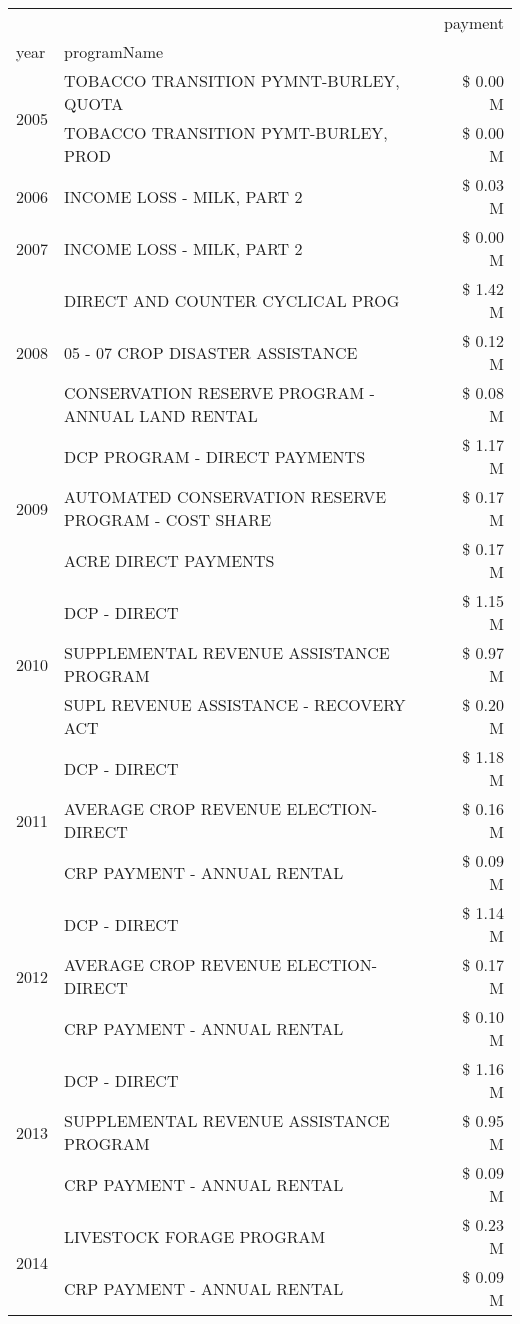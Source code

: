 \begin{tabular}{llr}
\toprule
 &  & payment \\
year & programName &  \\
\midrule
\multirow[t]{2}{*}{2005} & TOBACCO TRANSITION PYMNT-BURLEY, QUOTA & \$ 0.00 M \\
 & TOBACCO TRANSITION PYMT-BURLEY, PROD & \$ 0.00 M \\
\cline{1-3}
2006 & INCOME LOSS - MILK, PART 2 & \$ 0.03 M \\
\cline{1-3}
2007 & INCOME LOSS - MILK, PART 2 & \$ 0.00 M \\
\cline{1-3}
\multirow[t]{3}{*}{2008} & DIRECT AND COUNTER CYCLICAL PROG & \$ 1.42 M \\
 & 05 - 07 CROP DISASTER ASSISTANCE & \$ 0.12 M \\
 & CONSERVATION RESERVE PROGRAM - ANNUAL LAND RENTAL & \$ 0.08 M \\
\cline{1-3}
\multirow[t]{3}{*}{2009} & DCP PROGRAM - DIRECT PAYMENTS & \$ 1.17 M \\
 & AUTOMATED CONSERVATION RESERVE PROGRAM - COST SHARE & \$ 0.17 M \\
 & ACRE DIRECT PAYMENTS & \$ 0.17 M \\
\cline{1-3}
\multirow[t]{3}{*}{2010} & DCP - DIRECT & \$ 1.15 M \\
 & SUPPLEMENTAL REVENUE ASSISTANCE PROGRAM & \$ 0.97 M \\
 & SUPL REVENUE ASSISTANCE - RECOVERY ACT & \$ 0.20 M \\
\cline{1-3}
\multirow[t]{3}{*}{2011} & DCP - DIRECT & \$ 1.18 M \\
 & AVERAGE CROP REVENUE ELECTION-DIRECT & \$ 0.16 M \\
 & CRP PAYMENT - ANNUAL RENTAL & \$ 0.09 M \\
\cline{1-3}
\multirow[t]{3}{*}{2012} & DCP - DIRECT & \$ 1.14 M \\
 & AVERAGE CROP REVENUE ELECTION-DIRECT & \$ 0.17 M \\
 & CRP PAYMENT - ANNUAL RENTAL & \$ 0.10 M \\
\cline{1-3}
\multirow[t]{3}{*}{2013} & DCP - DIRECT & \$ 1.16 M \\
 & SUPPLEMENTAL REVENUE ASSISTANCE PROGRAM & \$ 0.95 M \\
 & CRP PAYMENT - ANNUAL RENTAL & \$ 0.09 M \\
\cline{1-3}
\multirow[t]{2}{*}{2014} & LIVESTOCK FORAGE PROGRAM & \$ 0.23 M \\
 & CRP PAYMENT - ANNUAL RENTAL & \$ 0.09 M \\

\end{tabular}
